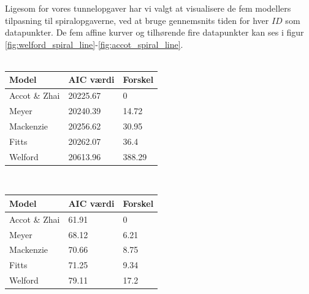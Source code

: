 Ligesom for vores tunnelopgaver har vi valgt at visualisere de fem modellers tilpasning til spiralopgaverne, ved at bruge gennemsnits tiden for hver $ID$ som datapunkter. De fem affine kurver og tilhørende fire datapunkter kan ses i figur \ref{fig:welford_spiral_line}-\ref{fig:accot_spiral_line}.\\\\
\begin{minipage}[t]{\linewidth}
	\begin{minipage}[t]{0.45\linewidth}
		\begin{tabular}{lll}
			Model & AIC værdi & Forskel\\\hline
			Accot \& Zhai & 20225.67 & 0\\
			Meyer & 20240.39 & 14.72 \\
			Mackenzie & 20256.62 & 30.95\\
			Fitts & 20262.07 & 36.4\\
			Welford & 20613.96 & 388.29
		\end{tabular}
		\label{tab:table_analysis_aic_spiral_all}
	\end{minipage}
	\begin{minipage}[t]{0.1\linewidth}
	~
	\end{minipage}
	\begin{minipage}[t]{0.45\linewidth}
		\begin{tabular}{lll}
			Model & AIC værdi & Forskel\\\hline
			Accot \& Zhai & 61.91 & 0\\
			Meyer & 68.12 & 6.21 \\
			Mackenzie & 70.66 & 8.75\\
			Fitts & 71.25 & 9.34\\
			Welford & 79.11 & 17.2
		\end{tabular}
		\label{tab:table_analysis_aic_spiral_mean}
	\end{minipage}
\end{minipage}

